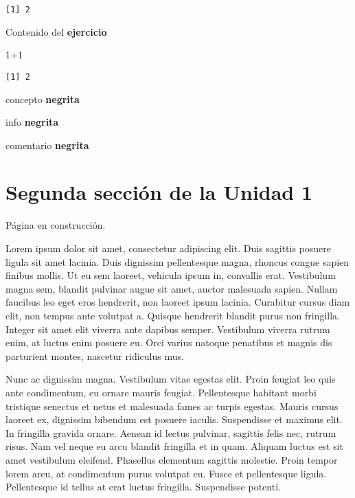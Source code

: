 \documentclass[
  letterpaper,
]{scrbook}
\newenvironment{Shaded}{\begin{snugshade}}{\end{snugshade}}
\newcommand{\DecValTok}[1]{\textcolor[rgb]{0.68,0.00,0.00}{#1}}
\newcommand{\SpecialCharTok}[1]{\textcolor[rgb]{0.37,0.37,0.37}{#1}}
\begin{document}
\begin{verbatim}
[1] 2
\end{verbatim}

Contenido del \textbf{ejercicio}

\begin{Shaded}
\begin{Highlighting}[]
\DecValTok{1}\SpecialCharTok{+}\DecValTok{1}
\end{Highlighting}
\end{Shaded}

\begin{verbatim}
[1] 2
\end{verbatim}

concepto \textbf{negrita}

info \textbf{negrita}

comentario \textbf{negrita}

\chapter{Segunda sección de la Unidad
1}\label{segunda-secciuxf3n-de-la-unidad-1}

\thispagestyle{primerapagina}

Página en construcción.

Lorem ipsum dolor sit amet, consectetur adipiscing elit. Duis sagittis
posuere ligula sit amet lacinia. Duis dignissim pellentesque magna,
rhoncus congue sapien finibus mollis. Ut eu sem laoreet, vehicula ipsum
in, convallis erat. Vestibulum magna sem, blandit pulvinar augue sit
amet, auctor malesuada sapien. Nullam faucibus leo eget eros hendrerit,
non laoreet ipsum lacinia. Curabitur cursus diam elit, non tempus ante
volutpat a. Quisque hendrerit blandit purus non fringilla. Integer sit
amet elit viverra ante dapibus semper. Vestibulum viverra rutrum enim,
at luctus enim posuere eu. Orci varius natoque penatibus et magnis dis
parturient montes, nascetur ridiculus mus.

Nunc ac dignissim magna. Vestibulum vitae egestas elit. Proin feugiat
leo quis ante condimentum, eu ornare mauris feugiat. Pellentesque
habitant morbi tristique senectus et netus et malesuada fames ac turpis
egestas. Mauris cursus laoreet ex, dignissim bibendum est posuere
iaculis. Suspendisse et maximus elit. In fringilla gravida ornare.
Aenean id lectus pulvinar, sagittis felis nec, rutrum risus. Nam vel
neque eu arcu blandit fringilla et in quam. Aliquam luctus est sit amet
vestibulum eleifend. Phasellus elementum sagittis molestie. Proin tempor
lorem arcu, at condimentum purus volutpat eu. Fusce et pellentesque
ligula. Pellentesque id tellus at erat luctus fringilla. Suspendisse
potenti.
\end{document}
